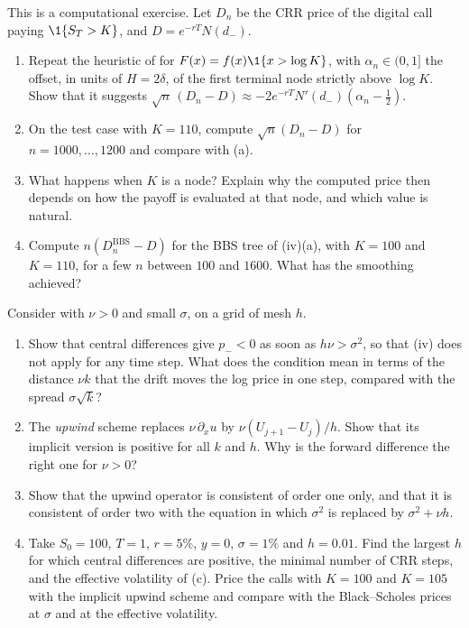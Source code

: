 \begin{exercise}\label{ex:fd-digital}
\medium This is a computational exercise. Let $D_n$ be the CRR price of the digital call paying
$\1\{S_T>K\}$, and $D=e^{-rT}N(d_-)$.
\begin{enumerate}[label=(\alph*)]
  \item Repeat the heuristic of  for $F(x)=f(x)\1\{x>\log K\}$, with
    $\alpha_n\in(0,1]$ the offset, in units of $H=2\delta$, of the first terminal node strictly above $\log K$.
    Show that it suggests $\sqrt n\,(D_n-D)\approx-2e^{-rT}N'(d_-)(\alpha_n-\frac12)$.
  \item On the test case with $K=110$, compute $\sqrt n(D_n-D)$ for $n=1000,\dots,1200$ and compare
    with (a).
  \item What happens when $K$ is a node? Explain why the computed price then depends on how the
    payoff is evaluated at that node, and which value is natural.
  \item Compute $n(D^{\mathrm{BBS}}_n-D)$ for the BBS tree of (iv)(a), with
    $K=100$ and $K=110$, for a few $n$ between $100$ and $1600$. What has the smoothing achieved?
\end{enumerate}
\end{exercise}

\begin{exercise}\label{ex:fd-upwind}
\medium Consider  with $\nu>0$ and small $\sigma$, on a grid of mesh $h$.
\begin{enumerate}[label=(\alph*)]
  \item Show that central differences give $p_-<0$ as soon as $h\nu>\sigma^2$, so that
    (iv) does not apply for any time step. What does the condition mean
    in terms of the distance $\nu k$ that the drift moves the log price in one step, compared with
    the spread $\sigma\sqrt k$?
  \item The \emph{upwind} scheme replaces $\nu\,\partial_xu$ by $\nu(U_{j+1}-U_j)/h$. Show that its implicit
    version is positive for all $k$ and $h$. Why is the forward difference the right one for $\nu>0$?
  \item Show that the upwind operator is consistent of order one only, and that it is consistent
    of order two with the equation in which $\sigma^2$ is replaced by $\sigma^2+\nu h$.
  \item Take $S_0=100$, $T=1$, $r=5\%$, $y=0$, $\sigma=1\%$ and $h=0.01$. Find the largest $h$ for which
    central differences are positive, the minimal number of CRR steps, and the effective
    volatility of (c). Price the calls with $K=100$ and $K=105$ with the implicit upwind scheme and
    compare with the Black--Scholes prices at $\sigma$ and at the effective volatility.
\end{enumerate}
\end{exercise}

